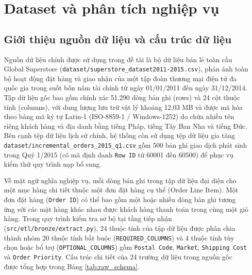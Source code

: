 \section{Dataset và phân tích nghiệp vụ}

\subsection{Giới thiệu nguồn dữ liệu và cấu trúc dữ liệu}

Nguồn dữ liệu chính được sử dụng trong đề tài là bộ dữ liệu bán lẻ toàn cầu Global Superstore (\texttt{dataset/superstore\_dataset2011-2015.csv}), phản ánh toàn bộ hoạt động đặt hàng và giao nhận của một tập đoàn thương mại điện tử đa quốc gia trong suốt bốn năm tài chính từ ngày 01/01/2011 đến ngày 31/12/2014. Tập dữ liệu gốc bao gồm chính xác 51.290 dòng bản ghi (rows) và 24 cột thuộc tính (columns), với dung lượng lưu trữ vật lý khoảng 12,03 MB và được mã hóa theo bảng mã ký tự Latin-1 (ISO-8859-1 / Windows-1252) do chứa nhiều tên riêng khách hàng và địa danh bằng tiếng Pháp, tiếng Tây Ban Nha và tiếng Đức. Bên cạnh tệp dữ liệu lịch sử chính, hệ thống còn sử dụng tệp dữ liệu gia tăng \texttt{dataset/incremental\_orders\_2015\_q1.csv} gồm 500 bản ghi giao dịch phát sinh trong Quý 1/2015 (có mã định danh \texttt{Row ID} từ 60001 đến 60500) để phục vụ kiểm thử quy trình nạp bổ sung.

Về mặt ngữ nghĩa nghiệp vụ, mỗi dòng bản ghi trong tập dữ liệu đại diện cho một mục hàng chi tiết thuộc một đơn đặt hàng cụ thể (Order Line Item). Một đơn đặt hàng (\texttt{Order ID}) có thể bao gồm một hoặc nhiều dòng bản ghi tương ứng với các mặt hàng khác nhau được khách hàng thanh toán trong cùng một giỏ hàng. Trong quy trình kiểm tra sơ bộ tại tầng tiếp nhận (\texttt{src/etl/bronze/extract.py}), 24 thuộc tính của tập dữ liệu được phân chia thành nhóm 20 thuộc tính bắt buộc (\texttt{REQUIRED\_COLUMNS}) và 4 thuộc tính tùy chọn hoặc bổ trợ (\texttt{OPTIONAL\_COLUMNS}) gồm \texttt{Postal Code}, \texttt{Market}, \texttt{Shipping Cost} và \texttt{Order Priority}. Cấu trúc chi tiết của 24 trường dữ liệu trong nguồn gốc được tổng hợp trong Bảng \ref{tab:raw_schema}.

